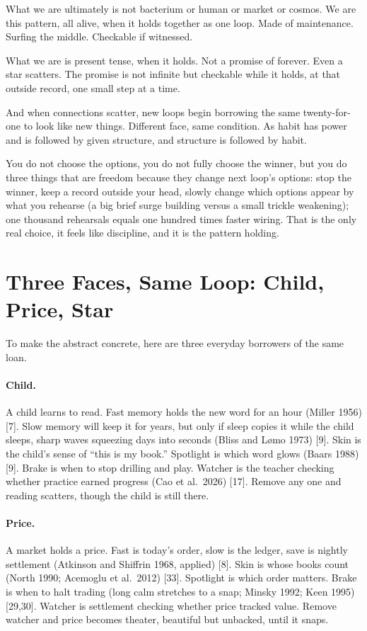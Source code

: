 \documentclass[11pt,a4paper]{article}
\begin{document}
What we are ultimately is not bacterium or human or market or cosmos. We are this pattern, all alive, when it holds together as one loop. Made of maintenance. Surfing the middle. Checkable if witnessed.

What we are is present tense, when it holds. Not a promise of forever. Even a star scatters. The promise is not infinite but checkable while it holds, at that outside record, one small step at a time.

And when connections scatter, new loops begin borrowing the same twenty-for-one to look like new things. Different face, same condition. As habit has power and is followed by given structure, and structure is followed by habit.

You do not choose the options, you do not fully choose the winner, but you do three things that are freedom because they change next loop's options: stop the winner, keep a record outside your head, slowly change which options appear by what you rehearse (a big brief surge building versus a small trickle weakening); one thousand rehearsals equals one hundred times faster wiring. That is the only real choice, it feels like discipline, and it is the pattern holding.

\section{Three Faces, Same Loop: Child, Price, Star}

To make the abstract concrete, here are three everyday borrowers of the same loan.

\paragraph{Child.} A child learns to read. Fast memory holds the new word for an hour (Miller 1956) [7]. Slow memory will keep it for years, but only if sleep copies it while the child sleeps, sharp waves squeezing days into seconds (Bliss and L{\o}mo 1973) [9]. Skin is the child's sense of ``this is my book.'' Spotlight is which word glows (Baars 1988) [9]. Brake is when to stop drilling and play. Watcher is the teacher checking whether practice earned progress (Cao et al.\ 2026) [17]. Remove any one and reading scatters, though the child is still there.

\paragraph{Price.} A market holds a price. Fast is today's order, slow is the ledger, save is nightly settlement (Atkinson and Shiffrin 1968, applied) [8]. Skin is whose books count (North 1990; Acemoglu et al.\ 2012) [33]. Spotlight is which order matters. Brake is when to halt trading (long calm stretches to a snap; Minsky 1992; Keen 1995) [29,30]. Watcher is settlement checking whether price tracked value. Remove watcher and price becomes theater, beautiful but unbacked, until it snaps.
\end{document}
